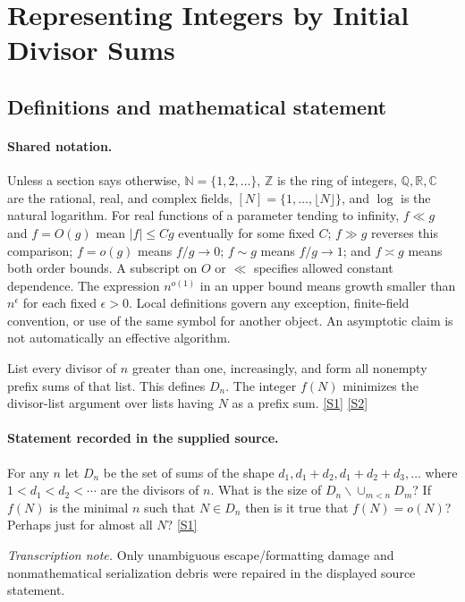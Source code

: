 \documentclass[11pt,a4paper]{article}
\newcommand{\N}{\mathbb{N}}
\newcommand{\Z}{\mathbb{Z}}
\newcommand{\Q}{\mathbb{Q}}
\newcommand{\R}{\mathbb{R}}
\newcommand{\C}{\mathbb{C}}
\newcommand{\sref}[2]{\hyperlink{source:#1:#2}{[S#2]}}
\begin{document}
\section{Representing Integers by Initial Divisor Sums}\label{statement}


\subsection{Definitions and mathematical statement}

\paragraph{Shared notation.}Unless a section says otherwise, $\N=\{1,2,\ldots\}$,
$\Z$ is the ring of integers, $\Q,\R,\C$ are the rational, real, and complex
fields, $[N]=\{1,\ldots,\lfloor N\rfloor\}$, and $\log$ is the natural
logarithm. For real functions of a parameter tending to infinity,
$f\ll g$ and $f=O(g)$ mean $|f|\leq Cg$ eventually for some fixed $C$;
$f\gg g$ reverses this comparison; $f=o(g)$ means $f/g\to0$;
$f\sim g$ means $f/g\to1$; and $f\asymp g$ means both order bounds.
A subscript on $O$ or $\ll$ specifies allowed constant dependence.
The expression $n^{o(1)}$ in an upper bound means growth smaller than
$n^\epsilon$ for each fixed $\epsilon>0$. Local definitions govern any
exception, finite-field convention, or use of the same symbol for another
object. An asymptotic claim is not automatically an effective algorithm.



List every divisor of $n$ greater than one, increasingly, and form all nonempty prefix sums of that list. This defines $D_n$. The integer $f(N)$ minimizes the divisor-list argument over lists having $N$ as a prefix sum. \sref{statement}{1} \sref{statement}{2}

\paragraph{Statement recorded in the supplied source.}
For any $n$ let $D_n$ be the set of sums of the shape $d_1,d_1+d_2,d_1+d_2+d_3,\ldots$ where $1<d_1<d_2<\cdots$ are the divisors of $n$.
What is the size of $D_n\backslash \cup_{m<n}D_m$?
If $f(N)$ is the minimal $n$ such that $N\in D_n$ then is it true that $f(N)=o(N)$? Perhaps just for almost all $N$? \sref{statement}{1}

{\small\emph{Transcription note.} Only unambiguous escape/formatting damage and nonmathematical serialization debris were repaired in the displayed source statement.}
\end{document}
